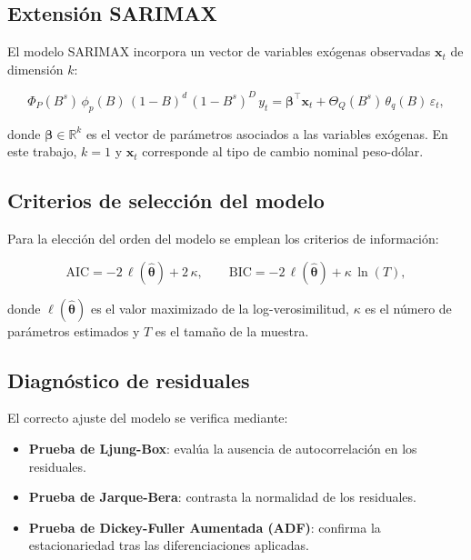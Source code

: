 \documentclass[12pt,a4paper]{article}
\begin{document}
\subsection{Extensión SARIMAX}

El modelo SARIMAX incorpora un vector de variables exógenas observadas $\mathbf{x}_t$ de dimensión $k$:

\begin{equation}
  \Phi_P(B^s)\,\phi_p(B)\,(1-B)^d\,(1-B^s)^D\, y_t = \boldsymbol{\beta}^\top \mathbf{x}_t + \Theta_Q(B^s)\,\theta_q(B)\,\varepsilon_t,
  \label{eq:sarimax}
\end{equation}

donde $\boldsymbol{\beta} \in \mathbb{R}^k$ es el vector de parámetros asociados a las variables exógenas. En este trabajo, $k=1$ y $\mathbf{x}_t$ corresponde al tipo de cambio nominal peso-dólar.

\subsection{Criterios de selección del modelo}

Para la elección del orden del modelo se emplean los criterios de información:

\begin{equation}
  \text{AIC} = -2\,\ell(\hat{\boldsymbol{\theta}}) + 2\,\kappa, \qquad
  \text{BIC} = -2\,\ell(\hat{\boldsymbol{\theta}}) + \kappa\,\ln(T),
  \label{eq:criterios}
\end{equation}

donde $\ell(\hat{\boldsymbol{\theta}})$ es el valor maximizado de la log-verosimilitud, $\kappa$ es el número de parámetros estimados y $T$ es el tamaño de la muestra.

\subsection{Diagnóstico de residuales}

El correcto ajuste del modelo se verifica mediante:
\begin{itemize}
  \item \textbf{Prueba de Ljung-Box}: evalúa la ausencia de autocorrelación en los residuales.
  \item \textbf{Prueba de Jarque-Bera}: contrasta la normalidad de los residuales.
  \item \textbf{Prueba de Dickey-Fuller Aumentada (ADF)}: confirma la estacionariedad tras las diferenciaciones aplicadas.
\end{itemize}
\end{document}
